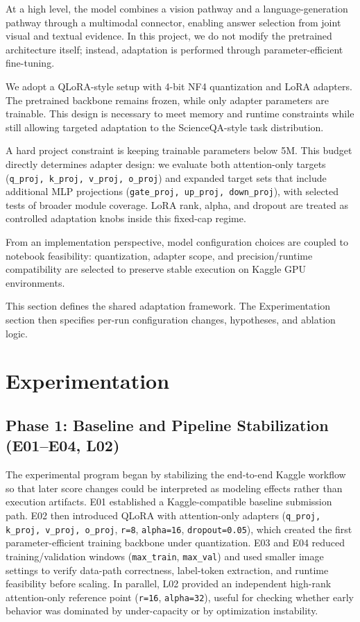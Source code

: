 \documentclass[11pt]{article}
\begin{document}
At a high level, the model combines a vision pathway and a language-generation pathway through a multimodal connector, enabling answer selection from joint visual and textual evidence. In this project, we do not modify the pretrained architecture itself; instead, adaptation is performed through parameter-efficient fine-tuning.

We adopt a QLoRA-style setup with 4-bit NF4 quantization and LoRA adapters. The pretrained backbone remains frozen, while only adapter parameters are trainable. This design is necessary to meet memory and runtime constraints while still allowing targeted adaptation to the ScienceQA-style task distribution.

A hard project constraint is keeping trainable parameters below 5M. This budget directly determines adapter design: we evaluate both attention-only targets (\texttt{q\_proj, k\_proj, v\_proj, o\_proj}) and expanded target sets that include additional MLP projections (\texttt{gate\_proj, up\_proj, down\_proj}), with selected tests of broader module coverage. LoRA rank, alpha, and dropout are treated as controlled adaptation knobs inside this fixed-cap regime.

From an implementation perspective, model configuration choices are coupled to notebook feasibility: quantization, adapter scope, and precision/runtime compatibility are selected to preserve stable execution on Kaggle GPU environments.

This section defines the shared adaptation framework. The Experimentation section then specifies per-run configuration changes, hypotheses, and ablation logic.

\section{Experimentation}
\subsection*{Phase 1: Baseline and Pipeline Stabilization (E01--E04, L02)}
The experimental program began by stabilizing the end-to-end Kaggle workflow so that later score changes could be interpreted as modeling effects rather than execution artifacts. E01 established a Kaggle-compatible baseline submission path. E02 then introduced QLoRA with attention-only adapters (\texttt{q\_proj, k\_proj, v\_proj, o\_proj}, \texttt{r=8}, \texttt{alpha=16}, \texttt{dropout=0.05}), which created the first parameter-efficient training backbone under quantization. E03 and E04 reduced training/validation windows (\texttt{max\_train}, \texttt{max\_val}) and used smaller image settings to verify data-path correctness, label-token extraction, and runtime feasibility before scaling. In parallel, L02 provided an independent high-rank attention-only reference point (\texttt{r=16}, \texttt{alpha=32}), useful for checking whether early behavior was dominated by under-capacity or by optimization instability.
\end{document}
